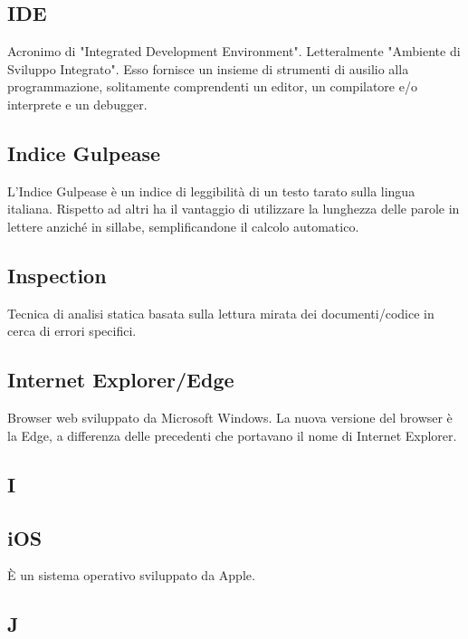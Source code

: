 \subsection*{IDE}
Acronimo di "Integrated Development Environment". Letteralmente "Ambiente
di Sviluppo Integrato". Esso fornisce un insieme di strumenti di ausilio
alla programmazione, solitamente comprendenti un editor, un compilatore e/o
interprete e un debugger.

\subsection*{Indice Gulpease}
L'Indice Gulpease è un indice di leggibilità di un testo tarato sulla lingua
italiana. Rispetto ad altri ha il vantaggio di utilizzare la lunghezza delle parole in lettere
anziché in sillabe, semplificandone il calcolo automatico.

\subsection*{Inspection }
Tecnica di analisi statica basata sulla lettura mirata dei documenti/codice in cerca di
errori specifici.

\subsection*{Internet Explorer/Edge}
Browser web sviluppato da Microsoft Windows. La nuova versione del browser è la Edge, a differenza delle precedenti che portavano il nome di Internet Explorer.

\newpage

\begin{center}
\Huge\section*{\uppercase{i}}
\end{center}

\subsection*{iOS}
È un sistema operativo sviluppato da Apple.

\newpage

\begin{center}
\Huge\section*{\uppercase{J}}
\end{center}

